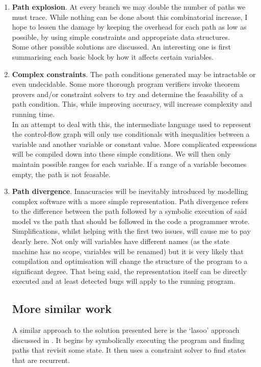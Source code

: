 \documentclass[12pt,a4paper]{article}
\begin{document}
\begin{enumerate}
\item \textbf{Path explosion}. At every branch we may double the number of paths we must trace. While
nothing can be done about this combinatorial increase, I hope to lessen the damage by keeping the overhead
for each path as low as possible, by using simple constraints and appropriate data structures.\\
Some other possible solutions are discussed. An interesting one is first summarising each basic block by how it affects certain variables.\\

\item \textbf{Complex constraints}. The path conditions generated may be intractable or even undecidable. Some more thorough program verifiers \cite{zhang, PNT}
invoke theorem provers and/or constraint solvers to try and determine the feasability of a path condition. This, while improving accuracy, will increase complexity
and running time.\\
In an attempt to deal with this, the intermediate language used to represent the control-flow graph will only
use conditionals with inequalities between a variable and another variable or constant value. More complicated expressions
will be compiled down into these simple conditions. We will then only maintain possible ranges for each variable. If a range of
a variable becomes empty, the path is not feasable.\\

\item \textbf{Path divergence}. Innacuracies will be inevitably introduced by modelling complex software with a more simple 
representation. Path divergence refers to the difference between the path followed by a symbolic execution of said model vs the path that
should be followed in the code a programmer wrote. Simplifications, whilst helping with the first two issues, will cause me to pay
dearly here. Not only will variables have different names (as the state machine has no scope, variables will be renamed) but it is very
likely that compilation and optimisation will change the structure of the program to a significant degree. That being said, the representation
itself can be directly executed and at least detected bugs will apply to the running program.

\subsection{More similar work}
A similar approach to the solution presented here is the `lasoo' approach discussed in \citep{gupta}. It begins by symbolically executing the program and finding paths that revisit some state. It then uses a constraint solver to find states that are recurrent.


\end{enumerate}
\end{document}
